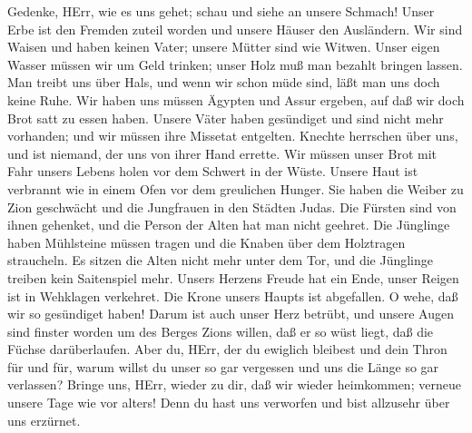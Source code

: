  Gedenke, HErr, wie es uns gehet; schau und siehe an unsere
Schmach!  Unser Erbe ist den Fremden zuteil worden und
unsere Häuser den Ausländern.  Wir sind Waisen und haben
keinen Vater; unsere Mütter sind wie Witwen.  Unser eigen
Wasser müssen wir um Geld trinken; unser Holz muß man bezahlt bringen
lassen.  Man treibt uns über Hals, und wenn wir schon müde
sind, läßt man uns doch keine Ruhe.  Wir haben uns müssen
Ägypten und Assur ergeben, auf daß wir doch Brot satt zu essen haben.
 Unsere Väter haben gesündiget und sind nicht mehr
vorhanden; und wir müssen ihre Missetat entgelten.  Knechte
herrschen über uns, und ist niemand, der uns von ihrer Hand errette.
 Wir müssen unser Brot mit Fahr unsers Lebens holen vor dem
Schwert in der Wüste.  Unsere Haut ist verbrannt wie in
einem Ofen vor dem greulichen Hunger.  Sie haben die Weiber
zu Zion geschwächt und die Jungfrauen in den Städten Judas.
 Die Fürsten sind von ihnen gehenket, und die Person der
Alten hat man nicht geehret.  Die Jünglinge haben
Mühlsteine müssen tragen und die Knaben über dem Holztragen straucheln.
 Es sitzen die Alten nicht mehr unter dem Tor, und die
Jünglinge treiben kein Saitenspiel mehr.  Unsers Herzens
Freude hat ein Ende, unser Reigen ist in Wehklagen verkehret.
 Die Krone unsers Haupts ist abgefallen. O wehe, daß wir so
gesündiget haben!  Darum ist auch unser Herz betrübt, und
unsere Augen sind finster worden  um des Berges Zions
willen, daß er so wüst liegt, daß die Füchse darüberlaufen.
 Aber du, HErr, der du ewiglich bleibest und dein Thron für
und für,  warum willst du unser so gar vergessen und uns
die Länge so gar verlassen?  Bringe uns, HErr, wieder zu
dir, daß wir wieder heimkommen; verneue unsere Tage wie vor alters!
 Denn du hast uns verworfen und bist allzusehr über uns
erzürnet.
